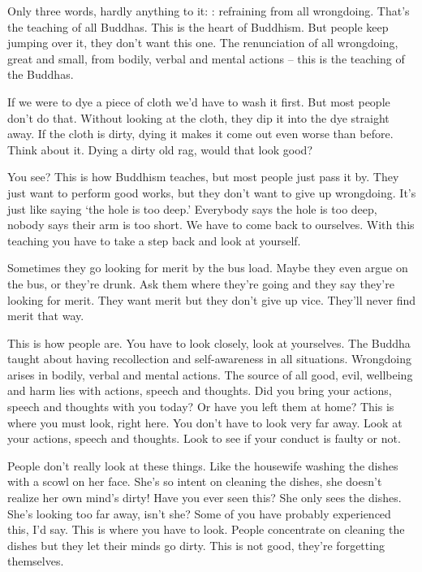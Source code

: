 Only three words, hardly anything to it: : refraining from all wrongdoing. That's the teaching of all Buddhas. This is the heart of Buddhism. But people keep jumping over it, they don't want this one. The renunciation of all wrongdoing, great and small, from bodily, verbal and mental actions -- this is the teaching of the Buddhas. 

If we were to dye a piece of cloth we'd have to wash it first. But most people don't do that. Without looking at the cloth, they dip it into the dye straight away. If the cloth is dirty, dying it makes it come out even worse than before. Think about it. Dying a dirty old rag, would that look good? 

You see? This is how Buddhism teaches, but most people just pass it by. They just want to perform good works, but they don't want to give up wrongdoing. It's just like saying `the hole is too deep.' Everybody says the hole is too deep, nobody says their arm is too short. We have to come back to ourselves. With this teaching you have to take a step back and look at yourself. 

Sometimes they go looking for merit by the bus load. Maybe they even argue on the bus, or they're drunk. Ask them where they're going and they say they're looking for merit. They want merit but they don't give up vice. They'll never find merit that way. 

This is how people are. You have to look closely, look at yourselves. The Buddha taught about having recollection and self-awareness in all situations. Wrongdoing arises in bodily, verbal and mental actions. The source of all good, evil, wellbeing and harm lies with actions, speech and thoughts. Did you bring your actions, speech and thoughts with you today? Or have you left them at home? This is where you must look, right here. You don't have to look very far away. Look at your actions, speech and thoughts. Look to see if your conduct is faulty or not. 

People don't really look at these things. Like the housewife washing the dishes with a scowl on her face. She's so intent on cleaning the dishes, she doesn't realize her own mind's dirty! Have you ever seen this? She only sees the dishes. She's looking too far away, isn't she? Some of you have probably experienced this, I'd say. This is where you have to look. People concentrate on cleaning the dishes but they let their minds go dirty. This is not good, they're forgetting themselves. 


